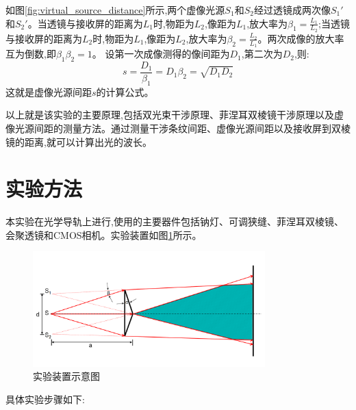 \documentclass[UTF8]{ctexart}
\begin{document}
如图\ref{fig:virtual_source_distance}所示,两个虚像光源$S_1$和$S_2$经过透镜成两次像$S_1'$和$S_2'$。当透镜与接收屏的距离为$L_1$时,物距为$L_2$,像距为$L_1$,放大率为$\beta_1=\frac{L_1}{L_2}$;当透镜与接收屏的距离为$L_2$时,物距为$L_1$,像距为$L_2$,放大率为$\beta_2=\frac{L_2}{L_1}$。两次成像的放大率互为倒数,即$\beta_1\beta_2=1$。
设第一次成像测得的像间距为$D_1$,第二次为$D_2$,则:
$$s=\frac{D_1}{\beta_1}=D_1\beta_2=\sqrt{D_1D_2}$$
这就是虚像光源间距$s$的计算公式。

以上就是该实验的主要原理,包括双光束干涉原理、菲涅耳双棱镜干涉原理以及虚像光源间距的测量方法。通过测量干涉条纹间距、虚像光源间距以及接收屏到双棱镜的距离,就可以计算出光的波长。



\section{实验方法}
本实验在光学导轨上进行,使用的主要器件包括钠灯、可调狭缝、菲涅耳双棱镜、会聚透镜和CMOS相机。实验装置如图\ref{fig:setup}所示。

\begin{figure}[htbp]
    \centering
    \includegraphics[width=0.8\textwidth]{ray.png}
    \caption{实验装置示意图}
    \label{fig:setup}
\end{figure}

具体实验步骤如下:
\end{document}
